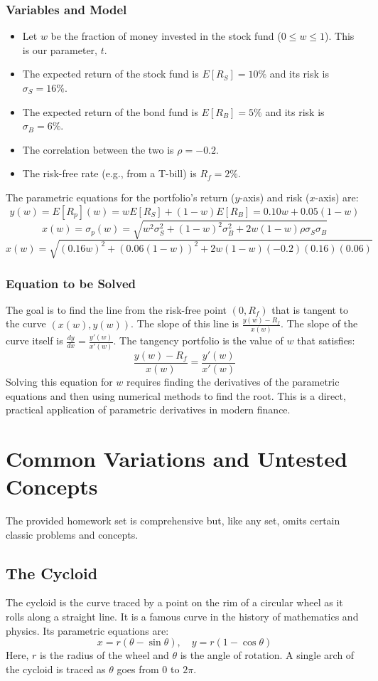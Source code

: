 \documentclass{article}
\begin{document}
\subsubsection{Variables and Model}
\begin{itemize}
    \item Let $w$ be the fraction of money invested in the stock fund ($0 \le w \le 1$). This is our parameter, $t$.
    \item The expected return of the stock fund is $E[R_S] = 10\%$ and its risk is $\sigma_S = 16\%$.
    \item The expected return of the bond fund is $E[R_B] = 5\%$ and its risk is $\sigma_B = 6\%$.
    \item The correlation between the two is $\rho = -0.2$.
    \item The risk-free rate (e.g., from a T-bill) is $R_f = 2\%$.
\end{itemize}
The parametric equations for the portfolio's return ($y$-axis) and risk ($x$-axis) are:
\[ y(w) = E[R_p](w) = w E[R_S] + (1-w) E[R_B] = 0.10w + 0.05(1-w) \]
\[ x(w) = \sigma_p(w) = \sqrt{w^2\sigma_S^2 + (1-w)^2\sigma_B^2 + 2w(1-w)\rho\sigma_S\sigma_B} \]
\[ x(w) = \sqrt{(0.16w)^2 + (0.06(1-w))^2 + 2w(1-w)(-0.2)(0.16)(0.06)} \]

\subsubsection{Equation to be Solved}
The goal is to find the line from the risk-free point $(0, R_f)$ that is tangent to the curve $(x(w), y(w))$. The slope of this line is $\frac{y(w) - R_f}{x(w)}$. The slope of the curve itself is $\frac{dy}{dx} = \frac{y'(w)}{x'(w)}$. The tangency portfolio is the value of $w$ that satisfies:
\[ \frac{y(w) - R_f}{x(w)} = \frac{y'(w)}{x'(w)} \]
Solving this equation for $w$ requires finding the derivatives of the parametric equations and then using numerical methods to find the root. This is a direct, practical application of parametric derivatives in modern finance.

\newpage
\section{Common Variations and Untested Concepts}
The provided homework set is comprehensive but, like any set, omits certain classic problems and concepts.

\subsection{The Cycloid}
The cycloid is the curve traced by a point on the rim of a circular wheel as it rolls along a straight line. It is a famous curve in the history of mathematics and physics. Its parametric equations are:
\[ x = r(\theta - \sin\theta), \quad y = r(1 - \cos\theta) \]
Here, $r$ is the radius of the wheel and $\theta$ is the angle of rotation. A single arch of the cycloid is traced as $\theta$ goes from $0$ to $2\pi$.
\end{document}
